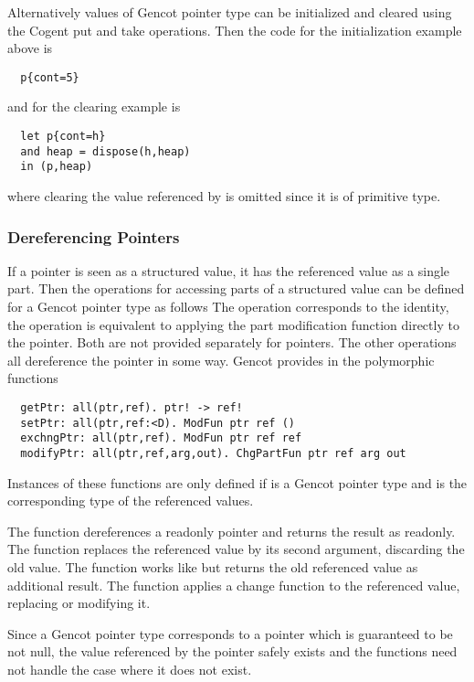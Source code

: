Alternatively values of Gencot pointer type can be initialized and cleared using the Cogent put and take
operations. Then the code for the initialization example above is
\begin{verbatim}
  p{cont=5}
\end{verbatim}
and for the clearing example is
\begin{verbatim}
  let p{cont=h}
  and heap = dispose(h,heap)
  in (p,heap)
\end{verbatim}
where clearing the value referenced by  is omitted since it is of primitive type.

\subsubsection{Dereferencing Pointers}

If a pointer is seen as a structured value, it has the referenced value as a single part.
Then the operations for accessing parts of a structured value can be defined for a Gencot pointer type as follows
The operation  corresponds to the identity, the operation  is equivalent to applying the
part modification function directly to the pointer. Both are not provided separately for pointers.
The other operations all dereference the pointer in some way. Gencot provides in  
the polymorphic functions
\begin{verbatim}
  getPtr: all(ptr,ref). ptr! -> ref! 
  setPtr: all(ptr,ref:<D). ModFun ptr ref ()
  exchngPtr: all(ptr,ref). ModFun ptr ref ref
  modifyPtr: all(ptr,ref,arg,out). ChgPartFun ptr ref arg out
\end{verbatim}
Instances of these functions are only defined if  is a Gencot pointer type and  is the corresponding
type of the referenced values. 

The function  dereferences a readonly pointer and returns the result as readonly. The function 
replaces the referenced value by its second argument, discarding the old value. The function  works like 
 but returns the old referenced value as additional result. The function  applies a change
function to the referenced value, replacing or modifying it.

Since a Gencot pointer type corresponds to a pointer which is guaranteed to be not null, the value referenced by the 
pointer safely exists and the functions need not handle the case where it does not exist.

